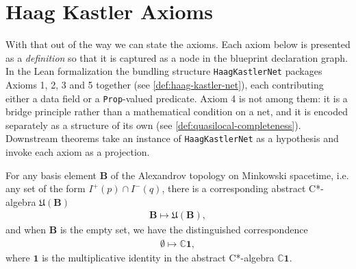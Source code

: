 \section{Haag Kastler Axioms}\label{sctn:haag-kastler-axioms}
With that out of the way we can state the axioms. Each axiom below is presented as a \emph{definition} so that it is captured as a node in the blueprint declaration graph. In the Lean formalization the bundling structure \texttt{HaagKastlerNet} packages Axioms 1, 2, 3 and 5 together (see \ref{def:haag-kastler-net}), each contributing either a data field or a \texttt{Prop}-valued predicate. Axiom 4 is not among them: it is a bridge principle rather than a mathematical condition on a net, and it is encoded separately as a structure of its own (see \ref{def:quasilocal-completeness}). Downstream theorems take an instance of \texttt{HaagKastlerNet} as a hypothesis and invoke each axiom as a projection.

\begin{definition}
    \label{def:local-algebras}
    \leanok
    For any basis element $\mathbf{B}$ of the Alexandrov topology on Minkowski spacetime, i.e. any set of the form $I^+(p) \cap I^-(q)$, there is a corresponding abstract C*-algebra $\mathfrak{U}(\mathbf{B})$
    \begin{align}
        \mathbf{B} \longmapsto \mathfrak{U}(\mathbf{B}),
    \end{align}
    and when $\mathbf{B}$ is the empty set, we have the distinguished correspondence
    \begin{align}
        \emptyset \longmapsto \mathbb{C} \mathbf{1},
    \end{align}
    where $\mathbf{1}$ is the multiplicative identity in the abstract C*-algebra $\mathbb{C} \mathbf{1}$.
\end{definition}

